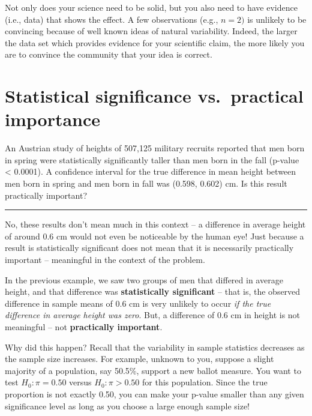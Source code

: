 \documentclass[
  10pt,
  openany]{book}
\theoremstyle{definition}
\theoremstyle{definition}
\theoremstyle{definition}
\theoremstyle{definition}
\theoremstyle{remark}
\begin{document}
Not only does your science need to be solid, but you also need to have evidence (i.e., data) that shows the effect.
A few observations (e.g., \(n = 2)\) is unlikely to be convincing because of well known ideas of natural variability.
Indeed, the larger the data set which provides evidence for your scientific claim, the more likely you are to convince the community that your idea is correct.

\section{Statistical significance vs.~practical importance}\label{statistical-significance-vs.-practical-importance}

An Austrian study of heights of 507,125 military recruits reported that men born in spring were statistically significantly taller than men born in the fall (p-value \textless{} 0.0001). A confidence interval for the true difference in mean height between men born in spring and men born in fall was (0.598, 0.602) cm. Is this result practically important?

\begin{center}\rule{0.5\linewidth}{0.5pt}\end{center}

No, these results don't mean much in this context -- a difference in average height of around 0.6 cm would not even be noticeable by the human eye! Just because a result is statistically significant does not mean that it is necessarily practically important -- meaningful in the context of the problem.

In the previous example, we saw two groups of men that differed in average height, and that difference was \textbf{statistically significant} -- that is, the observed difference in sample means of 0.6 cm is very unlikely to occur \emph{if the true difference in average height was zero}. But, a difference of 0.6 cm in height is not meaningful -- not \textbf{practically important}.

Why did this happen? Recall that the variability in sample statistics decreases as the sample size increases. For example, unknown to you, suppose a slight majority of a population, say 50.5\%, support a new ballot measure. You want to test \(H_0: \pi = 0.50\) versus \(H_0: \pi > 0.50\) for this population. Since the true proportion is not exactly 0.50, you can make your p-value smaller than any given significance level as long as you choose a large enough sample size!
\end{document}
